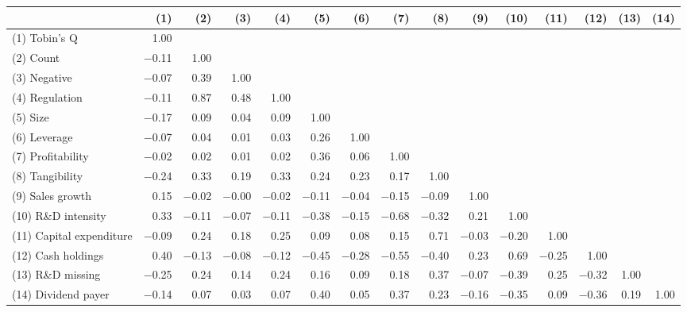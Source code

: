 \begin{tabular}{lrrrrrrrrrrrrrr}
\toprule
 & (1) & (2) & (3) & (4) & (5) & (6) & (7) & (8) & (9) & (10) & (11) & (12) & (13) & (14) \\
\midrule
(1) Tobin's Q & 1.00 &  &  &  &  &  &  &  &  &  &  &  &  &  \\
(2) Count & $-$0.11 & 1.00 &  &  &  &  &  &  &  &  &  &  &  &  \\
(3) Negative & $-$0.07 & 0.39 & 1.00 &  &  &  &  &  &  &  &  &  &  &  \\
(4) Regulation & $-$0.11 & 0.87 & 0.48 & 1.00 &  &  &  &  &  &  &  &  &  &  \\
(5) Size & $-$0.17 & 0.09 & 0.04 & 0.09 & 1.00 &  &  &  &  &  &  &  &  &  \\
(6) Leverage & $-$0.07 & 0.04 & 0.01 & 0.03 & 0.26 & 1.00 &  &  &  &  &  &  &  &  \\
(7) Profitability & $-$0.02 & 0.02 & 0.01 & 0.02 & 0.36 & 0.06 & 1.00 &  &  &  &  &  &  &  \\
(8) Tangibility & $-$0.24 & 0.33 & 0.19 & 0.33 & 0.24 & 0.23 & 0.17 & 1.00 &  &  &  &  &  &  \\
(9) Sales growth & 0.15 & $-$0.02 & $-$0.00 & $-$0.02 & $-$0.11 & $-$0.04 & $-$0.15 & $-$0.09 & 1.00 &  &  &  &  &  \\
(10) R\&D intensity & 0.33 & $-$0.11 & $-$0.07 & $-$0.11 & $-$0.38 & $-$0.15 & $-$0.68 & $-$0.32 & 0.21 & 1.00 &  &  &  &  \\
(11) Capital expenditure & $-$0.09 & 0.24 & 0.18 & 0.25 & 0.09 & 0.08 & 0.15 & 0.71 & $-$0.03 & $-$0.20 & 1.00 &  &  &  \\
(12) Cash holdings & 0.40 & $-$0.13 & $-$0.08 & $-$0.12 & $-$0.45 & $-$0.28 & $-$0.55 & $-$0.40 & 0.23 & 0.69 & $-$0.25 & 1.00 &  &  \\
(13) R\&D missing & $-$0.25 & 0.24 & 0.14 & 0.24 & 0.16 & 0.09 & 0.18 & 0.37 & $-$0.07 & $-$0.39 & 0.25 & $-$0.32 & 1.00 &  \\
(14) Dividend payer & $-$0.14 & 0.07 & 0.03 & 0.07 & 0.40 & 0.05 & 0.37 & 0.23 & $-$0.16 & $-$0.35 & 0.09 & $-$0.36 & 0.19 & 1.00 \\
\bottomrule
\end{tabular}
